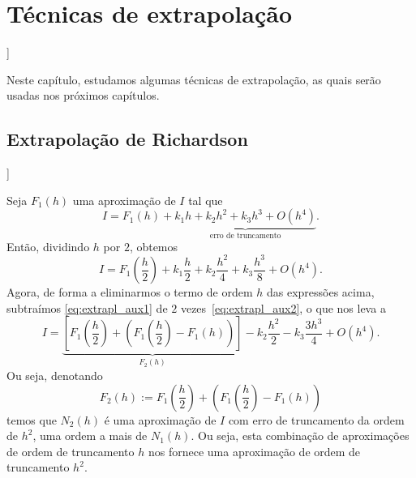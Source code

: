 
\chapter{Técnicas de extrapolação}\label{cap_extrapl}
\thispagestyle{fancy}

\begin{flushleft}
  [[tag:revisar]]
\end{flushleft}

Neste capítulo, estudamos algumas técnicas de extrapolação, as quais serão usadas nos próximos capítulos.

\section{Extrapolação de Richardson}\label{cap_extrapl_sec_Richardson}

\begin{flushleft}
  [[tag:revisar]]
\end{flushleft}

Seja $F_1(h)$ uma aproximação de $I$ tal que
\begin{equation}\label{eq:extrapl_aux1}
  I = F_1(h) + \underbrace{k_1h + k_2h^2 + k_3h^3 + O(h^4)}_{\text{erro de truncamento}}.
\end{equation}
Então, dividindo $h$ por $2$, obtemos
\begin{equation}\label{eq:extrapl_aux2}
  I = F_1\left(\frac{h}{2}\right) + k_1\frac{h}{2} + k_2\frac{h^2}{4} + k_3\frac{h^3}{8} + O(h^4).
\end{equation}
Agora, de forma a eliminarmos o termo de ordem $h$ das expressões acima, subtraímos \eqref{eq:extrapl_aux1} de $2$ vezes~\eqref{eq:extrapl_aux2}, o que nos leva a
\begin{equation}\label{eq:extrapl_aux3}
  I = \underbrace{\left[F_1\left(\frac{h}{2}\right) + \left(F_1\left(\frac{h}{2}\right) - F_1(h)\right)\right]}_{F_2(h)} - k_2\frac{h^2}{2} - k_3\frac{3h^3}{4} + O(h^4).
\end{equation}
Ou seja, denotando
\begin{equation}
  F_2(h) := F_1\left(\frac{h}{2}\right) + \left(F_1\left(\frac{h}{2}\right) - F_1(h)\right)
\end{equation}
temos que $N_2(h)$ é uma aproximação de $I$ com erro de truncamento da ordem de $h^2$, uma ordem a mais de $N_1(h)$. Ou seja, esta combinação de aproximações de ordem de truncamento $h$ nos fornece uma aproximação de ordem de truncamento $h^2$.

